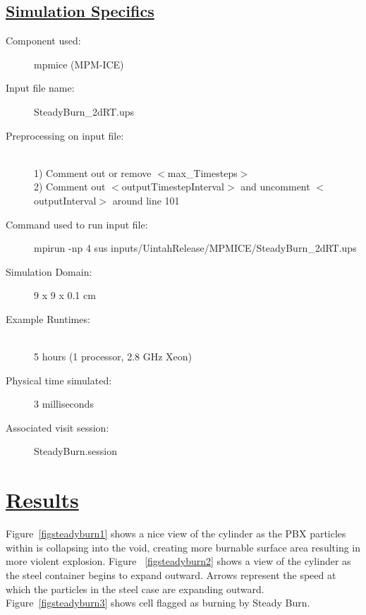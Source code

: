 \subsection*{\underline{Simulation Specifics}}
\begin{description}
\item [Component used:] \hfill mpmice (MPM-ICE)
\item [Input file name:] \hfill SteadyBurn\_2dRT.ups
\item [Preprocessing on input file:]\hfill \\ 1) Comment out or remove $<$max\_Timesteps$>$ \\ 2) Comment out $<$outputTimestepInterval$>$ and uncomment $<$outputInterval$>$ around line 101 \\
\item [Command used to run input file:]\hfill mpirun -np 4 sus inputs/UintahRelease/MPMICE/SteadyBurn\_2dRT.ups

\item [Simulation Domain:]\hfill    9 x 9 x 0.1 cm

\item [Example Runtimes:] \hfill \\
 5 hours   (1 processor, 2.8 GHz Xeon)

\item [Physical time simulated:] \hfill 3 milliseconds \\ 


\item [Associated visit session:] \hfill SteadyBurn.session

\end{description}

\newpage

\section*{\underline{Results}}

Figure~\ref{figsteadyburn1} shows a nice view of the cylinder as the
PBX particles within is collapsing into the void, creating more
burnable surface area resulting in more violent explosion.  Figure
~\ref{figsteadyburn2} shows a view of the cylinder as the steel
container begins to expand outward.  Arrows represent the speed at
which the particles in the steel case are expanding outward.
Figure~\ref{figsteadyburn3} shows cell flagged as burning by Steady
Burn.


